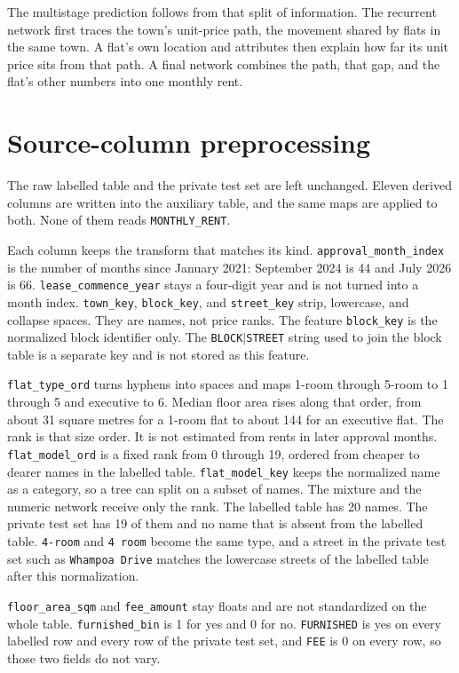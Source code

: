 \documentclass[11pt]{article}
\begin{document}
The multistage prediction follows from that split of information.
The recurrent network first traces the town's unit-price path, the movement shared by flats in the same town.
A flat's own location and attributes then explain how far its unit price sits from that path.
A final network combines the path, that gap, and the flat's other numbers into one monthly rent.

\section{Source-column preprocessing}
\label{sec:source}

The raw labelled table and the private test set are left unchanged.
Eleven derived columns are written into the auxiliary table, and the same maps are applied to both.
None of them reads \texttt{MONTHLY\_RENT}.

Each column keeps the transform that matches its kind.
\texttt{approval\_month\_index} is the number of months since January 2021: September 2024 is 44 and July 2026 is 66.
\texttt{lease\_commence\_year} stays a four-digit year and is not turned into a month index.
\texttt{town\_key}, \texttt{block\_key}, and \texttt{street\_key} strip, lowercase, and collapse spaces.
They are names, not price ranks.
The feature \texttt{block\_key} is the normalized block identifier only.
The \texttt{BLOCK}$|$\texttt{STREET} string used to join the block table is a separate key and is not stored as this feature.

\texttt{flat\_type\_ord} turns hyphens into spaces and maps 1-room through 5-room to 1 through 5 and executive to 6.
Median floor area rises along that order, from about 31 square metres for a 1-room flat to about 144 for an executive flat.
The rank is that size order.
It is not estimated from rents in later approval months.
\texttt{flat\_model\_ord} is a fixed rank from 0 through 19, ordered from cheaper to dearer names in the labelled table.
\texttt{flat\_model\_key} keeps the normalized name as a category, so a tree can split on a subset of names.
The mixture and the numeric network receive only the rank.
The labelled table has 20 names.
The private test set has 19 of them and no name that is absent from the labelled table.
\texttt{4-room} and \texttt{4 room} become the same type, and a street in the private test set such as \texttt{Whampoa Drive} matches the lowercase streets of the labelled table after this normalization.

\texttt{floor\_area\_sqm} and \texttt{fee\_amount} stay floats and are not standardized on the whole table.
\texttt{furnished\_bin} is 1 for yes and 0 for no.
\texttt{FURNISHED} is yes on every labelled row and every row of the private test set, and \texttt{FEE} is 0 on every row, so those two fields do not vary.
\end{document}
